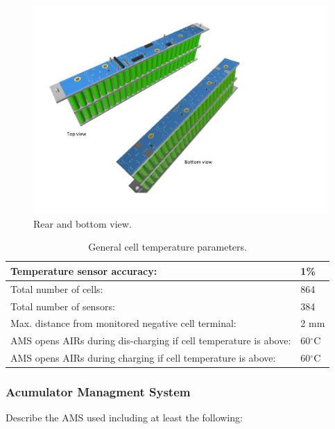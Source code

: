 \begin{figure}[H]
	\centering
	\includegraphics[width=\textwidth]{./img/BMS-top-andbottom.pdf}
	\caption{Rear and bottom view.}
	\label{fig:torque1}
\end{figure}

\begin{table}[H]
	\centering
	\caption{General cell temperature parameters.}
	\begin{tabularx}{\textwidth}{|X|X|}
		\hline
		Temperature sensor accuracy: & 1\% \\[\TableSize]
		\hline
		Total number of cells: & 864 \\[\TableSize]
		\hline
		Total number of sensors: &  384 \\[\TableSize]
		\hline
		Max. distance from monitored negative cell terminal: & 2 mm \\[\TableSize]
		\hline
		AMS opens AIRs during dis-charging if cell temperature is above: & 60$^\circ$C \\[\TableSize]
		\hline
		AMS opens AIRs during charging if cell temperature is above: & 60$^\circ$C \\[\TableSize]
		\hline
	\end{tabularx}%
	\label{tab:acc-temp}%
\end{table}%

\subsubsection{Acumulator Managment System}
Describe the AMS used including at least the following:

